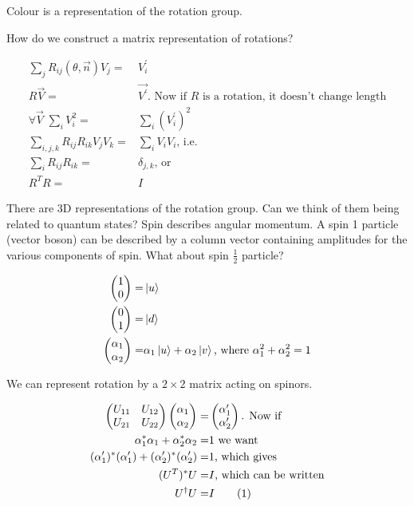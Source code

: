 \documentclass[]{article}
\newcommand\numberthis{\addtocounter{equation}{1}\tag{\theequation}}
\begin{document}
Colour is a representation of the rotation group.

How do we construct a matrix representation of rotations? 

\begin{align*}
	\sum_j R_{ij}(\theta,\vec{n})V_j=&V_i^\prime \\
	R \vec{V} =&\vec{V^\prime} \text{. Now if $R$ is a rotation, it doesn't change length}\\
	\forall \vec{V} \; \sum_i V_i^2 =& \sum_i (V_i^\prime)^2\\
	\sum_{i,j,k} R_{ij} R_{ik} V_j V_k =& \sum_i V_i V_i \text{, i.e.}\\
	\sum_{i} R_{ij} R_{ik} =& \delta_{j,k} \text{, or}\\
	R^T R =& I
\end{align*}

There are 3D representations of the rotation group. Can we think of them being related to quantum states? Spin describes angular momentum. A spin 1 particle (vector boson) can be described by a column vector containing amplitudes for the various components of spin. What about spin $\frac{1}{2}$ particle?

\begin{align*}
	\begin{pmatrix}
		1\\
		0
	\end{pmatrix}=& \ket{u}\\
	\begin{pmatrix}
		0\\
		1
	\end{pmatrix}=& \ket{d}\\
	\begin{pmatrix}
		\alpha_1\\
		\alpha_2
	\end{pmatrix}=& \alpha_1 \ket{u} + \alpha_2 \ket{v} \text{, where $\alpha_1^2+\alpha_2^2=1$}
\end{align*}

We can represent rotation by a $2\times2$ matrix acting on spinors.

\begin{align*}
	\begin{pmatrix}
		U_{11}&U_{12}\\
		U_{21}&U_{22}
	\end{pmatrix} 	\begin{pmatrix}
		\alpha_1\\
		\alpha_2
	\end{pmatrix} =& \begin{pmatrix}
		\alpha^\prime_1\\
		\alpha^\prime_2
	\end{pmatrix} \text{{. Now if}}\\
	\alpha^*_1 \alpha_1 + \alpha^*_2 \alpha_2 =& 1 \text{ we want}\\
	(\alpha^\prime_1)^* (\alpha^\prime_1) + (\alpha^\prime_2)^* (\alpha^\prime_2) =& 1 \text{, which gives}\\
	(U^T)^* U =& I \text{, which can be written} \\
	U^\dagger U =& I \numberthis \label{eq:unitary:2}
\end{align*}
\end{document}

